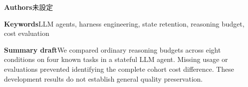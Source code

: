 \documentclass[uplatex,a4paper,twocolumn,10pt]{jsarticle}
\begin{document}
\noindent\textbf{Authors}\quad 未設定

\noindent\textbf{Keywords}\quad LLM agents, harness engineering, state retention, reasoning budget, cost evaluation

\noindent\textbf{Summary draft}\quad We compared ordinary reasoning budgets across eight conditions on four known tasks in a stateful LLM agent. Missing usage or evaluations prevented identifying the complete cohort cost difference. These development results do not establish general quality preservation.
\end{document}
